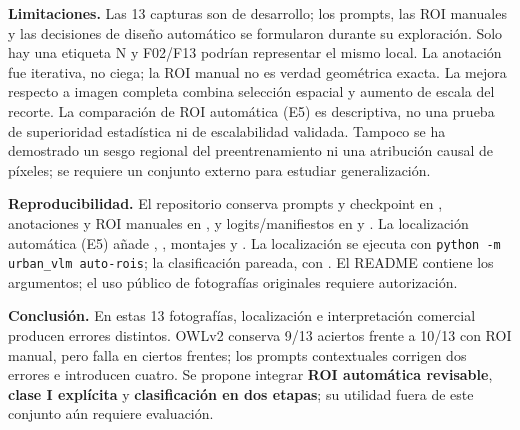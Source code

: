 \documentclass[10pt,a4paper]{article}
\begin{document}
\textbf{Limitaciones.} Las 13 capturas son de desarrollo; los prompts, las ROI manuales y las decisiones de diseño automático se formularon durante su exploración. Solo hay una etiqueta N y F02/F13 podrían representar el mismo local. La anotación fue iterativa, no ciega; la ROI manual no es verdad geométrica exacta. La mejora respecto a imagen completa combina selección espacial y aumento de escala del recorte. La comparación de ROI automática (E5) es descriptiva, no una prueba de superioridad estadística ni de escalabilidad validada. Tampoco se ha demostrado un sesgo regional del preentrenamiento ni una atribución causal de píxeles; se requiere un conjunto externo para estudiar generalización.

\textbf{Reproducibilidad.} El repositorio conserva prompts y checkpoint en , anotaciones y ROI manuales en , y logits/manifiestos en  y . La localización automática (E5) añade , , montajes y . La localización se ejecuta con \texttt{python -m urban\_vlm auto-rois}; la clasificación pareada, con . El README contiene los argumentos; el uso público de fotografías originales requiere autorización.

\textbf{Conclusión.} En estas 13 fotografías, localización e interpretación comercial producen errores distintos. OWLv2 conserva 9/13 aciertos frente a 10/13 con ROI manual, pero falla en ciertos frentes; los prompts contextuales corrigen dos errores e introducen cuatro. Se propone integrar \textbf{ROI automática revisable}, \textbf{clase I explícita} y \textbf{clasificación en dos etapas}; su utilidad fuera de este conjunto aún requiere evaluación.
\end{document}
